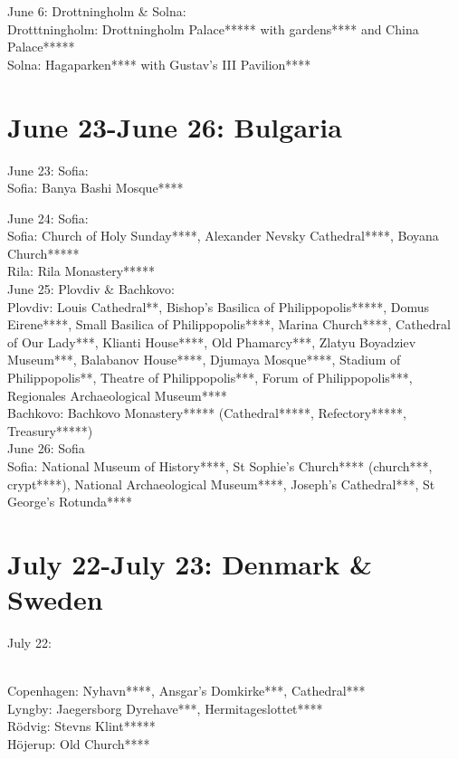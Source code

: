 June 6: Drottningholm \& Solna:\\

Drotttningholm: Drottningholm Palace***** with gardens**** and China Palace*****\\
Solna: Hagaparken**** with Gustav's III Pavilion****\\

\section{June 23-June 26: Bulgaria}
\label{2023:Bulgaria}

June 23: Sofia:\\

Sofia: Banya Bashi Mosque****

June 24: Sofia:\\

Sofia: Church of Holy Sunday****, Alexander Nevsky Cathedral****, Boyana Church*****\\
Rila: Rila Monastery*****\\

June 25: Plovdiv \& Bachkovo:\\

Plovdiv: Louis Cathedral**, Bishop's Basilica of Philippopolis*****, Domus Eirene****, Small Basilica of Philippopolis****, Marina Church****, Cathedral of Our Lady***,
Klianti House****, Old Phamarcy***, Zlatyu Boyadziev Museum***, Balabanov House****, Djumaya Mosque****, Stadium of Philippopolis**, Theatre of Philippopolis***, Forum of Philippopolis***,
Regionales Archaeological Museum****\\
Bachkovo: Bachkovo Monastery***** (Cathedral*****, Refectory*****, Treasury*****)\\

June 26: Sofia\\

Sofia: National Museum of History****, St Sophie's Church**** (church***, crypt****), National Archaeological Museum****, Joseph's Cathedral***, St George's Rotunda****\\

\section{July 22-July 23: Denmark \& Sweden}
\label{2023:DenmarkSweden}

July 22:\\\

Copenhagen: Nyhavn****, Ansgar's Domkirke***, Cathedral***\\
Lyngby: Jaegersborg Dyrehave***, Hermitageslottet****\\
R\"odvig: Stevns Klint*****\\
H\"ojerup: Old Church****\\


